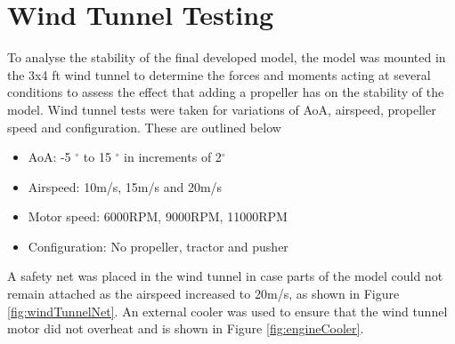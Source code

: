 \section{Wind Tunnel Testing}
To analyse the stability of the final developed model, the model was mounted in the 3x4 ft wind tunnel to determine the forces and moments acting at several conditions to assess the effect that adding a propeller has on the stability of the model. Wind tunnel tests were taken for variations of \acrshort{AoA}, airspeed, propeller speed and configuration. These are outlined below

\begin{itemize}
    \item \acrshort{AoA}: -5 $^{\circ}$ to 15 $^{\circ}$ in increments of 2$^{\circ}$
    \item Airspeed: 10m/s, 15m/s and 20m/s
    \item Motor speed: 6000RPM, 9000RPM, 11000RPM
    \item Configuration: No propeller, tractor and pusher
\end{itemize}


A safety net was placed in the wind tunnel in case parts of the model could not remain attached as the airspeed increased to 20m/s, as shown in Figure \ref{fig:windTunnelNet}. An external cooler was used to ensure that the wind tunnel motor did not overheat and is shown in Figure \ref{fig:engineCooler}.


    



